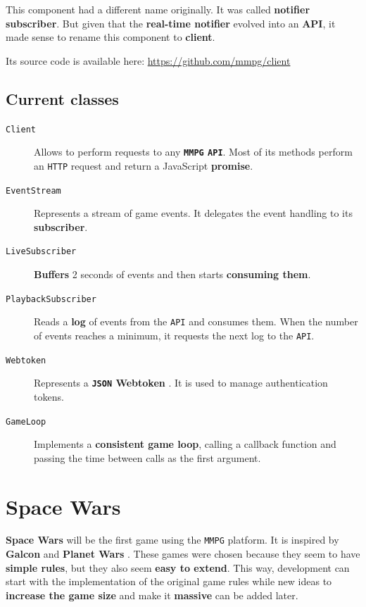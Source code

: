 \documentclass[a4paper,11pt,titlepage,abstract,numbers=noenddot,automark,mnsy,intlimits,rgb,dvipsnames]{report}
\begin{document}
This component had a different name originally. It was called \textbf{notifier subscriber}. But given that the \textbf{real-time
notifier} evolved into an \textbf{API}, it made sense to rename this component to \textbf{client}.

Its source code is available here: \url{https://github.com/mmpg/client}
\section{Current classes}
\begin{description}
\item[\texttt{Client}]
Allows to perform requests to any \textbf{\texttt{MMPG} \texttt{API}}. Most of its methods perform an \texttt{HTTP} request
  and return a JavaScript \textbf{promise}.
\item[\texttt{EventStream}]
Represents a stream of game events. It delegates the event handling to its \textbf{subscriber}.
\item[\texttt{LiveSubscriber}]
\textbf{Buffers} 2 seconds of events and then starts \textbf{consuming them}.
\item[\texttt{PlaybackSubscriber}]
Reads a \textbf{log} of events from the \texttt{API} and consumes them. When the number of
  events reaches a minimum, it requests the next log to the \texttt{API}.
\item[\texttt{Webtoken}]
Represents a \textbf{\texttt{JSON} Webtoken} \cite{jwt}. It is used to manage authentication tokens.
\item[\texttt{GameLoop}]
Implements a \textbf{consistent game loop}, calling a callback function and passing the time
  between calls as the first argument.
\end{description}
\clearpage
\chapter{Space Wars}
\textbf{Space Wars} will be the first game using the \texttt{MMPG} platform. It is inspired by \textbf{Galcon} \cite{galcon}
and \textbf{Planet Wars} \cite{planet_wars}. These games were chosen because they seem to have \textbf{simple rules}, but they
also seem \textbf{easy to extend}. This way, development can start with the implementation of the original game rules while
new ideas to \textbf{increase the game size} and make it \textbf{massive} can be added later.
\end{document}
